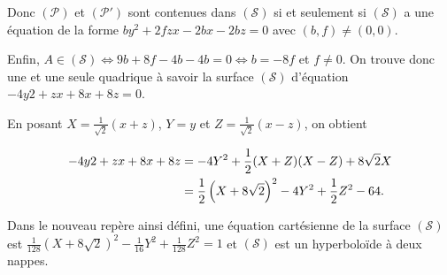 {{Donc $(\mathcal{P})$ et $(\mathcal{P}')$ sont contenues dans $(\mathcal{S})$ si et seulement si $(\mathcal{S})$ a une équation de la forme $by^2+2fzx-2bx-2bz = 0$ avec $(b,f)\neq(0,0)$. 

Enfin, $A\in(\mathcal{S})\Leftrightarrow 9b+8f-4b-4b = 0\Leftrightarrow b = -8f$ et $f\neq0$. On trouve donc une et une seule quadrique à savoir la surface $(\mathcal{S})$ d'équation $-4y2+zx+8x+8z=0$.

En posant $X=\frac{1}{\sqrt{2}}(x+z)$, $Y=y$ et $Z=\frac{1}{\sqrt{2}}(x-z)$, on obtient

\begin{align*}\ensuremath
-4y2+zx+8x+8z&=-4Y^2+\frac{1}{2}(X+Z)(X-Z)+8\sqrt{2}X\\
 &=\frac{1}{2}\left(X+8\sqrt{2}\right)^2-4Y^2+\frac{1}{2}Z^2 - 64.
\end{align*}

Dans le nouveau repère ainsi défini, une équation cartésienne de la surface $(\mathcal{S})$ est $\frac{1}{128}\left(X+8\sqrt{2}\right)^2-\frac{1}{16}Y^2+\frac{1}{128}Z^2=1$ et $(\mathcal{S})$ est  un hyperboloïde à deux nappes.
}
}
